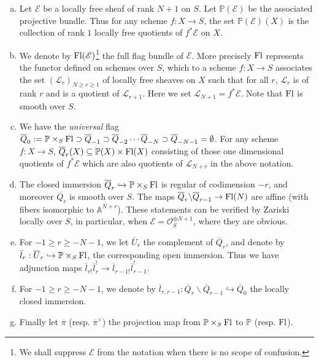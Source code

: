 \documentclass[12pt, reqno]{amsart}
\theoremstyle{plain}
\theoremstyle{definition}
\theoremstyle{definition}
\newcommand{\bbA}{{\mathbb A}}
\newcommand{\bbP}{{\mathbb P}}
\newcommand{\sE}{{\mathscr E}}
\newcommand{\sL}{{\mathscr L}}
\newcommand{\sO}{{\mathscr O}}
\begin{document}
\begin{enumerate}[(a)]

    \item Let $\sE$ be a locally free sheaf of rank $N+1$ on $S$. Let $\bbP(\sE)$ be the associated projective bundle. Thus for any scheme $f \colon X \to S$, the set $\bbP(\sE)(X)$ is the collection of rank $1$ locally free quotients of $f^*\sE$ on $X$.

    \item We denote by $\textup{Fl}(\sE)$\footnote{We shall suppress $\sE$ from the notation when there is no scope of confusion.} the full flag bundle of $\sE$. More precisely $\textup{Fl}$ represents the functor defined on schemes over $S$, which to a scheme $f: X \to S$ associates the set $(\sL_{r})_{N \geq r \geq 1}$ of locally free sheaves on $X$ such that for all $r$, $\sL_r$ is of rank $r$ and is a quotient of $\sL_{r+1}$. Here we set $\sL_{N+1}=f^*\sE$. Note that $\textup{Fl}$ is smooth over $S$.

    \item We have the \textit{universal} flag $\overline{Q}_{0}:=\bbP \times_S \textup{Fl} \supset \overline{Q}_{-1} \supset \overline{Q}_{-2} \cdots \overline{Q}_{-N} \supset \overline{Q}_{-N-1}=\emptyset$. For any scheme $f \colon X \to S$, $\overline{Q}_{r}(X) \subseteq \bbP(X) \times \textup{Fl}(X)$ consisting of those one dimensional quotients of $f^{*}\sE$ which are also quotients of $\sL_{N+r}$ in the above notation. 

    \item The closed immersion $\overline{Q}_{r} \hookrightarrow \bbP \times_S \textup{Fl}$ is regular of  codimension $-r$, and moreover $\overline{Q_{r}}$ is smooth over $S$. The maps $\overline{Q}_{r} \backslash \overline{Q}_{r-1} \to \textup{Fl}(N)$ are affine (with fibers isomorphic to $\bbA^{N+r}$). These statements can be verified by Zariski locally over $S$, in particular, when $\sE=\sO_S^{\oplus N+1}$, where they are obvious.

     \item  For $-1 \geq r \geq -N-1$, we let $\overline{U}_{r}$ the complement of $\overline{Q}_{r}$, and denote by $\bar{l}_{r}:\overline{U}_{r} \hookrightarrow \bbP \times_S \textup{Fl}$, the corresponding open immersion. Thus we have adjunction maps $\overline{l}_{r!}\overline{l}_{r}^{!} \to \overline{l}_{r-1!}\overline{l}^{!}_{r-1}$.
     
     \item  For $-1 \geq r \geq -N-1$, we denote by $\overline{l}_{r,r-1} \colon \overline{Q}_{r} \backslash \overline{Q}_{r-1} \hookrightarrow \overline{Q}_{0}$ the locally closed immersion.

     \item Finally let  $\overline{\pi}$ (resp. $\overline{\pi}^{\vee}$) the projection map from $\bbP \times_S \textup{Fl}$ to $\bbP$ (resp. $\textup{Fl}$).
   


\end{enumerate} 
\end{document}
